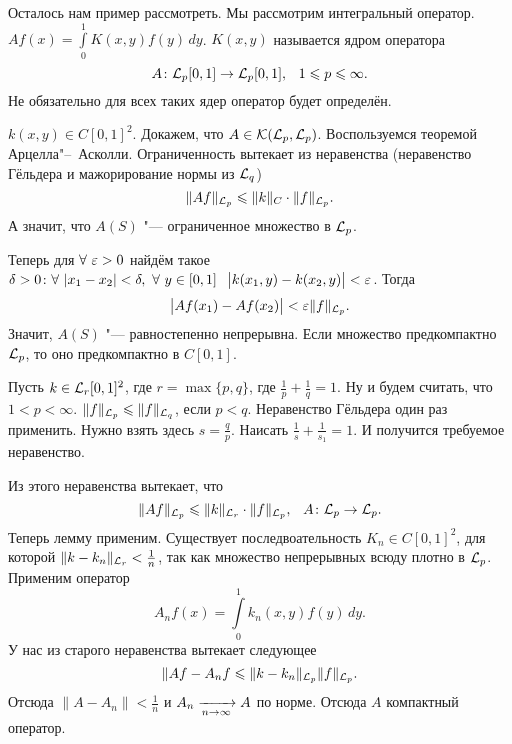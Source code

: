 Осталось нам пример рассмотреть. Мы рассмотрим интегральный оператор. $Af(x) = \int\limits_0^1 K(x,y) f(y)\,dy$. $K(x,y)$ называется ядром оператора
\[
  A\colon \L_p[0,1]\to \L_p[0,1],\pau 1\le p\le \infty.
\]
Не обязательно для всех таких ядер оператор будет определён.
\begin{roItems}
\item $k(x,y)\in C[0,1]^2$. Докажем, что $A\in\mathcal K(\mathcal L_p,\mathcal L_p)$. Воспользуемся теоремой Арцелла"--~Асколли. Ограниченность вытекает из неравенства (неравенство Гёльдера и мажорирование нормы из $\mathcal L_q$)
\[
  \|Af\|_{\mathcal L_p}\leqslant \|k\|_C\cdot \|f\|_{\mathcal L_p}.
\]
А значит, что $A(S)$ "--- ограниченное множество в $\mathcal L_p$.

Теперь для $\forall\ \varepsilon>0$ найдём такое $\delta>0\colon \forall\ |x_1-x_2|<\delta,\ \forall\ y\in[0,1]\pau \big|k(x_1,y) - k(x_2,y)\big|<\e$. Тогда
\[
  \big|Af(x_1) - Af(x_2)\big|<\varepsilon\|f\|_{\mathcal L_p}.
\]
Значит, $A(S)$ "--- равностепенно непрерывна. Если множество предкомпактно $\mathcal L_p$, то оно предкомпактно в $C[0,1]$.
\item Пусть $k\in\mathcal L_r[0,1]^2$, где $r = \max\{p,q\}$, где $\frac1p +\frac1q = 1$. Ну и будем считать, что $1<p<\infty$.
$  \|f\|_{\mathcal L_p}\leqslant \|f\|_{\mathcal L_q}$, если $p<q$. Неравенство Гёльдера один раз применить. Нужно взять здесь $s = \frac qp$. Наисать $\frac1s + \frac1{s_1}=1$. И получится требуемое неравенство.

Из этого неравенства вытекает, что
\[
  \|A f\|_{\L_p}\le \|k\|_{\L_r}\cdot\|f\|_{\L_p},\pau A\colon \L_p\to\L_p.
\]
Теперь лемму применим. Существует последвоательность $K_n\in C[0,1]^2$, для которой $\|k-k_n\|_{\mathcal L_r}<\frac1n$, так как множество непрерывных всюду плотно в $\mathcal L_p$. Применим оператор
\[
  A_n f(x) = \int\limits_0^1 k_n(x,y) f(y)\,dy.
\]
У нас из старого неравенства вытекает следующее
\[
  \|A f - A_nf\leqslant \| k-k_n\|_{\mathcal L_p}\|f\|_{\mathcal L_p}.
\]
Отсюда $\|A-A_n\|<\frac1n$ и $A_n\xrightarrow[n\rightarrow\infty]{} A$ по норме. Отсюда $A$ компактный оператор.
\end{roItems}
